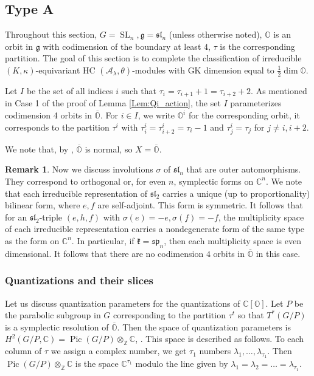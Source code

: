 \documentclass[12pt]{amsart}
\newcommand{\C}{\mathbb{C}}
\newcommand{\A}{\mathcal{A}}
\newcommand{\g}{\mathfrak{g}}
\newcommand{\Orb}{\mathbb{O}}
\newcommand{\kf}{\mathfrak{k}}
\newcommand{\SL}{\operatorname{SL}}
\newcommand{\slf}{\mathfrak{sl}}
\theoremstyle{definition}
\newtheorem{Rem}[Thm]{Remark}
\numberwithin{equation}{section}
\begin{document}

\subsection{Type A} \label{SS:type_A}
Throughout this section, $G=\operatorname{SL}_n, \g=\mathfrak{sl}_n$ (unless otherwise
noted), $\Orb$
is an orbit in $\g$ with codimension of the boundary at least $4$, $\tau$
is the corresponding partition. The goal of this section is to complete the classification of irreducible
$(K,\kappa)$-equivariant HC $(\A_\lambda,\theta)$-modules with GK dimension equal to $\frac{1}{2}\dim \Orb$.


Let $I$ be the set of all indices $i$
such that $\tau_{i}=\tau_{i+1}+1=\tau_{i+2}+2$. As mentioned in Case 1
of the proof of Lemma \ref{Lem:Qi_action},
the set $I$ parameterizes codimension 4 orbits in $\overline{\Orb}$.
For $i\in I$, we write $\Orb^i$ for the corresponding orbit, it corresponds
to the partition $\tau^i$ with $\tau^i_i=\tau^i_{i+2}=\tau_i-1$ and $\tau^i_j=\tau_j$
for $j\neq i,i+2$.

We note that, by \cite{KP_normal}, $\overline{\Orb}$ is normal, so $X=\overline{\Orb}$.

\begin{Rem}\label{Rem:outer_involutions}
Now we discuss involutions $\sigma$ of $\mathfrak{sl}_n$ that are outer automorphisms. They correspond
to orthogonal or, for even $n$, symplectic forms on $\C^n$. We note that each irreducible representation
of $\slf_2$ carries a unique (up to proportionality) bilinear form, where $e,f$ are self-adjoint.
This form is symmetric. It follows that for an $\slf_2$-triple $(e,h,f)$ with $\sigma(e)=-e, \sigma(f)=-f$, the multiplicity space of each irreducible representation carries a nondegenerate form
of the same type as the form on $\C^n$. In particular, if $\kf=\mathfrak{sp}_n$, then each multiplicity
space is even dimensional. It follows that there are no codimension $4$ orbits in $\overline{\Orb}$
in this case.
\end{Rem}

\subsubsection{Quantizations and their slices}\label{SS_type_A_quant}
Let us discuss quantization parameters for the quantizations of $\C[\Orb]$.
Let $P$ be the parabolic subgroup in
$G$ corresponding to the partition $\tau^t$ so that $T^*(G/P)$ is a symplectic resolution of
$\overline{\Orb}$. Then the space of quantization
parameters is $H^2(G/P,\C)=\operatorname{Pic}(G/P)\otimes_{\mathbb{Z}} \C$,
\cite[Section 3.2]{orbit}.
This space is described as follows. To each column
of $\tau$ we assign a complex number, we get $\tau_1$ numbers $\lambda_1,\ldots,
\lambda_{\tau_1}$. Then $\operatorname{Pic}(G/P)\otimes_{\mathbb{Z}} \C$
is the space $\C^{\tau_1}$ modulo the line given by $\lambda_1=\lambda_2=\ldots=\lambda_{\tau_1}$.
\end{document}
